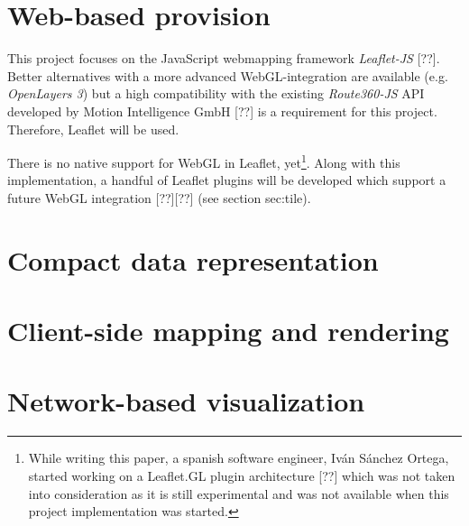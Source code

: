   \section{Web-based provision}
    \label{sec:requr:websd}
    This project focuses on the JavaScript webmapping framework \textit{Leaflet-JS} [??]. Better alternatives with a more advanced WebGL-integration are available (e.g. \textit{OpenLayers 3}) but a high compatibility with the existing \textit{Route360-JS} API developed by Motion Intelligence GmbH [??] is a requirement for this project. Therefore, Leaflet will be used.\par
    There is no native support for WebGL in Leaflet, yet\footnote{While writing this paper, a spanish software engineer, Iván Sánchez Ortega, started working on a Leaflet.GL plugin architecture [??] which was not taken into consideration as it is still experimental and was not available when this project implementation was started.}. Along with this implementation, a handful of Leaflet plugins will be developed which support a future WebGL integration [??][??] (see section {sec:tile}).\par

  \section{Compact data representation}
    \label{sec:requr:data}

  \section{Client-side mapping and rendering}
    \label{sec:requr:clien}

  \section{Network-based visualization}
    \label{sec:requr:netwr}


